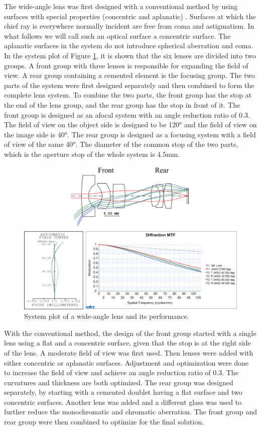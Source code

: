 The wide-angle lens was first designed with a conventional method by using surfaces with special properties (concentric and aplanatic) \cite{LivshitsQA2013}. Surfaces at which the chief ray is everywhere normally incident are free from coma and astigmatism. In what follows we will call such an optical surface a concentric surface. The aplanatic surfaces in the system do not introduce spherical aberration and coma. In the system plot of Figure \ref{fig:wideanglelensPerformance}, it is shown that the six lenses are divided into two groups. A front group with three lenses is responsible for expanding the field of view. A rear group containing a cemented element is the focusing group. The two parts of the system were first designed separately and then combined to form the complete lens system. To combine the two parts, the front group has the stop at the end of the lens group, and the rear group has the stop in front of it.  The front group is designed as an afocal system with an angle reduction ratio of 0.3. The field of view on the object side is designed to be 120° and the field of view on the image side is 40°. The rear group is designed as a focusing system with a field of view of the same 40°. The diameter of the common stop of the two parts, which is the aperture stop of the whole system is 4.5mm. 

\begin{figure}[h!]
    \centering
    \includegraphics[scale=0.68]{chapter-4/figures/WideAngleL.png}
    \caption{System plot of a wide-angle lens and its performance.}
    \label{fig:wideanglelensPerformance}
\end{figure}

With the conventional method, the design of the front group started with a single lens using a flat and a concentric surface, given that the stop is at the right side of the lens. A moderate field of view was first used. Then lenses were added with either concentric or aplanatic surfaces. Adjustment and optimization were done to increase the field of view and achieve an angle reduction ratio of 0.3. The curvatures and thickness are both optimized. The rear group was designed separately, by starting with a cemented doublet having a flat surface and two concentric surfaces. Another lens was added and a different glass was used to further reduce the monochromatic and chromatic aberration. The front group and rear group were then combined to optimize for the final solution.

